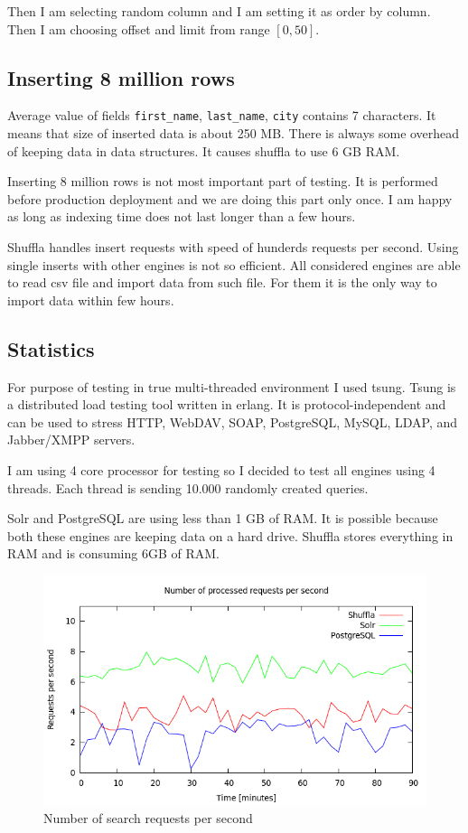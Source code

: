 \documentclass[10pt,a4paper]{article}
\begin{document}
Then I am selecting random column and I am setting it as order by column. Then I am choosing offset and limit from range $[0, 50]$.

\subsection{Inserting 8 million rows}

Average value of fields \verb|first_name|, \verb|last_name|, \verb|city| contains 7 characters. It means that size of inserted data is about 250 MB. There is always some overhead of keeping data in data structures. It causes shuffla to use 6 GB RAM.

Inserting 8 million rows is not most important part of testing. It is performed before production deployment and we are doing this part only once. I am happy as long as indexing time does not last longer than a few hours. 

Shuffla handles insert requests with speed of hunderds requests per second. Using single inserts with other engines is not so efficient. All considered engines are able to read csv file and import data from such file. For them it is the only way to import data within few hours.

\subsection{Statistics}

For purpose of testing in true multi-threaded environment I used tsung. Tsung is a distributed load testing tool written in erlang. It is protocol-independent and can be used to stress HTTP, WebDAV, SOAP, PostgreSQL, MySQL, LDAP, and Jabber/XMPP servers. 

I am using 4 core processor for testing so I decided to test all engines using 4 threads. Each thread is sending 10.000 randomly created queries. 

Solr and PostgreSQL are using less than 1 GB of RAM. It is possible because both these engines are keeping data on a hard drive. Shuffla stores everything in RAM and is consuming 6GB of RAM. 

\begin{figure}
\centering
  \includegraphics[width=12cm]{request_count_tn}
  \caption{Number of search requests per second}
  \label{fig:request_count_tn}
\end{figure}
\end{document}

